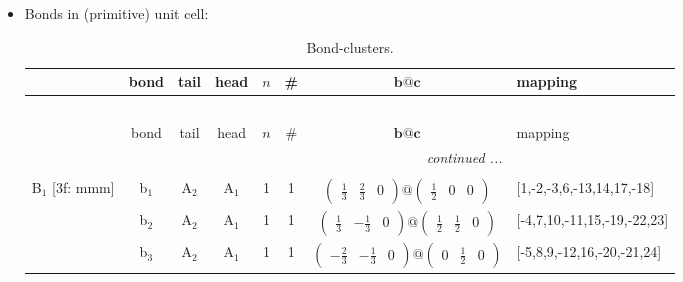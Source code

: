 \documentclass[fleqn,10pt,landscape]{article}
\begin{document}
\begin{itemize}
\item Bonds in (primitive) unit cell:
\begin{center}
\renewcommand{\arraystretch}{1.3}
\begin{longtable}{cc|cc|c|c|c|l}
\caption{Bond-clusters.}
 \\
 \hline \hline
 & bond & tail & head & $n$ & \# & $\bm{b}@\bm{c}$ & mapping \\ \hline \endfirsthead

\multicolumn{7}{l}{\tablename\ \thetable{}} \\
 \hline \hline
 & bond & tail & head & $n$ & \# & $\bm{b}@\bm{c}$ & mapping \\ \hline \endhead

 \hline \hline
\multicolumn{7}{r}{\footnotesize\it continued ...} \\ \endfoot

 \hline \hline
\multicolumn{7}{r}{} \\ \endlastfoot

B$_{1}$ [3f: mmm] & b$_{1}$ & A$_{2}$ & A$_{1}$ & 1 & 1 & $\begin{pmatrix} \frac{1}{3} & \frac{2}{3} & 0 \end{pmatrix}@\begin{pmatrix} \frac{1}{2} & 0 & 0 \end{pmatrix}$ & [1,-2,-3,6,-13,14,17,-18] \\
& b$_{2}$ & A$_{2}$ & A$_{1}$ & 1 & 1 & $\begin{pmatrix} \frac{1}{3} & - \frac{1}{3} & 0 \end{pmatrix}@\begin{pmatrix} \frac{1}{2} & \frac{1}{2} & 0 \end{pmatrix}$ & [-4,7,10,-11,15,-19,-22,23] \\
& b$_{3}$ & A$_{2}$ & A$_{1}$ & 1 & 1 & $\begin{pmatrix} - \frac{2}{3} & - \frac{1}{3} & 0 \end{pmatrix}@\begin{pmatrix} 0 & \frac{1}{2} & 0 \end{pmatrix}$ & [-5,8,9,-12,16,-20,-21,24] \\
\end{longtable}
\end{center}


\end{itemize}
\end{document}
